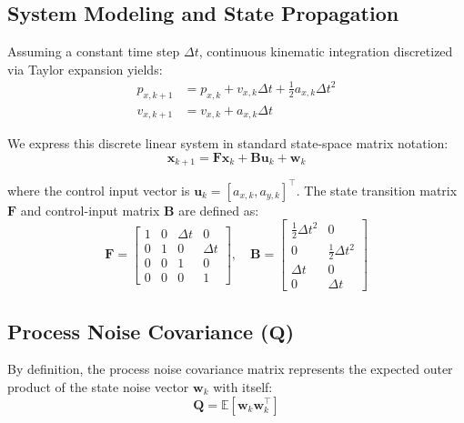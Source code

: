 \documentclass{article}
\begin{document}
	\subsection{System Modeling and State Propagation}
	
	Assuming a constant time step $\Delta t$, continuous kinematic integration discretized via Taylor expansion yields:
	\begin{align*}
		p_{x, k+1} &= p_{x, k} + v_{x, k} \Delta t + \frac{1}{2} a_{x, k} \Delta t^2 \\
		v_{x, k+1} &= v_{x, k} + a_{x, k} \Delta t
	\end{align*}
	
	We express this discrete linear system in standard state-space matrix notation:
	\begin{equation}
		\mathbf{x}_{k+1} = \mathbf{F} \mathbf{x}_k + \mathbf{B} \mathbf{u}_k + \mathbf{w}_k
	\end{equation}
	
	where the control input vector is $\mathbf{u}_k = [a_{x, k}, a_{y, k}]^\top$. The state transition matrix $\mathbf{F}$ and control-input matrix $\mathbf{B}$ are defined as:
	\begin{equation}
		\mathbf{F} = 
		\begin{bmatrix}
			1 & 0 & \Delta t & 0 \\
			0 & 1 & 0 & \Delta t \\
			0 & 0 & 1 & 0 \\
			0 & 0 & 0 & 1
		\end{bmatrix}, \quad
		\mathbf{B} = 
		\begin{bmatrix}
			\frac{1}{2}\Delta t^2 & 0 \\
			0 & \frac{1}{2}\Delta t^2 \\
			\Delta t & 0 \\
			0 & \Delta t
		\end{bmatrix}
	\end{equation}
	
	\subsection{Process Noise Covariance ($\mathbf{Q}$)}
	
	By definition, the process noise covariance matrix represents the expected outer product of the state noise vector $\mathbf{w}_k$ with itself:
	\begin{equation}
		\mathbf{Q} = \mathbb{E}\left[\mathbf{w}_k \mathbf{w}_k^\top\right]
	\end{equation}
	
\end{document}
